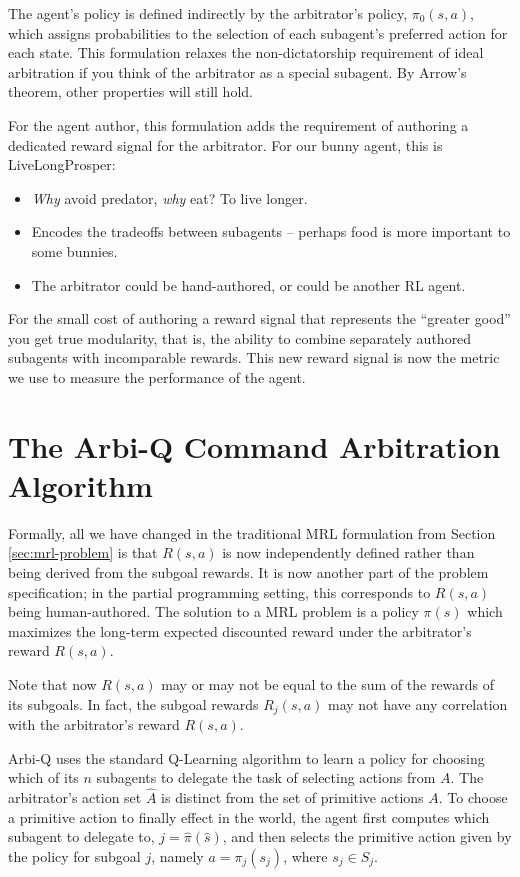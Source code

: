 The agent's policy is defined indirectly by the arbitrator's policy, $\pi_0(s, a)$, which assigns probabilities to the selection of each subagent's preferred action for each state.  This formulation relaxes the non-dictatorship requirement of ideal arbitration if you think of the arbitrator as a special subagent.  By Arrow's theorem, other properties will still hold.

For the agent author, this formulation adds the requirement of authoring a dedicated reward signal for the arbitrator.  For our bunny agent, this is LiveLongProsper:

\begin{itemize}
\item {\em Why} avoid predator, {\em why} eat? To live longer.
\item Encodes the tradeoffs between subagents -- perhaps food is more
  important to some bunnies.
\item The arbitrator could be hand-authored, or could be another RL
  agent.
\end{itemize}

For the small cost of authoring a reward signal that represents the ``greater good'' you get true modularity, that is, the ability to combine separately authored subagents with incomparable rewards.  This new reward signal is now the metric we use to measure the performance of the agent.

\section{The Arbi-Q Command Arbitration Algorithm}\label{sec:mrl-arbiq}

Formally, all we have changed in the traditional MRL formulation from Section \ref{sec:mrl-problem} is that $R(s,a)$ is now independently defined rather than being derived from the subgoal rewards.  It is now another part of the problem specification; in the partial programming setting, this corresponds to $R(s,a)$ being human-authored.  The solution to a MRL problem is a policy $\pi(s)$ which maximizes the long-term expected discounted reward under the arbitrator's reward $R(s,a)$.

Note that now $R(s,a)$ may or may not be equal to the sum of the rewards of its subgoals.  In fact, the subgoal rewards $R_j(s,a)$ may not have any correlation with the arbitrator's reward $R(s,a)$.

Arbi-Q uses the standard Q-Learning algorithm to learn a policy for choosing which of its $n$ subagents to delegate the task of selecting actions from $A$.  The arbitrator's action set $\widehat{A}$ is distinct from the set of primitive actions $A$.  To choose a primitive action to finally effect in the world, the agent first computes which subagent to delegate to, $j=\widehat{\pi}(\widehat{s})$, and then selects the primitive action given by the policy for subgoal $j$, namely $a=\pi_j(s_j)$, where $s_j \in S_j$.

